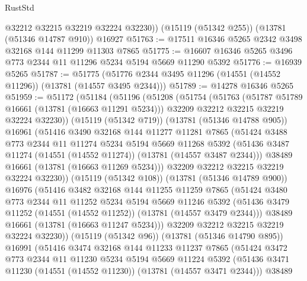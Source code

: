 \begin{lexlean}{RustStd}
\begin{coremodule}
        @32212
        @32215
        @32219
        @32224
        @32230))
    (@15119 (@51342 @255))
    (@13781 (@51346 @14787 @910))
    @16927
@51763 := @17511 @16346 @5265 @2342 @3498 @32168 @144 @11299 @11303 @7865
@51775 := @16607 @16346 @5265 @3496 @773 @2344 @11 @11296 @5234 @5194 @5669 @11290 @5392
@51776 := @16939 @5265
@51787 := @51775 (@51776 @2344 @3495 @11296 (@14551 (@14552 @11296)) (@13781 (@14557 @3495 @2344)))
@51789 := @14278 @16346 @5265
@51959 := @51172
    (@51184
      (@51196
        (@51208
          (@51754
            (@51763
              (@51787 @51789 @16661 (@13781 (@16663 @11291 @5234)))
              @32209
              @32212
              @32215
              @32219
              @32224
              @32230))
          (@15119 (@51342 @719))
          (@13781 (@51346 @14788 @905))
          @16961
          (@51416
            @3490
            @32168
            @144
            @11277
            @11281
            @7865
            (@51424
              @3488
              @773
              @2344
              @11
              @11274
              @5234
              @5194
              @5669
              @11268
              @5392
              (@51436 @3487 @11274 (@14551 (@14552 @11274)) (@13781 (@14557 @3487 @2344)))
              @38489
              @16661
              (@13781 (@16663 @11269 @5234)))
            @32209
            @32212
            @32215
            @32219
            @32224
            @32230))
        (@15119 (@51342 @108))
        (@13781 (@51346 @14789 @900))
        @16976
        (@51416
          @3482
          @32168
          @144
          @11255
          @11259
          @7865
          (@51424
            @3480
            @773
            @2344
            @11
            @11252
            @5234
            @5194
            @5669
            @11246
            @5392
            (@51436 @3479 @11252 (@14551 (@14552 @11252)) (@13781 (@14557 @3479 @2344)))
            @38489
            @16661
            (@13781 (@16663 @11247 @5234)))
          @32209
          @32212
          @32215
          @32219
          @32224
          @32230))
      (@15119 (@51342 @96))
      (@13781 (@51346 @14790 @895))
      @16991
      (@51416
        @3474
        @32168
        @144
        @11233
        @11237
        @7865
        (@51424
          @3472
          @773
          @2344
          @11
          @11230
          @5234
          @5194
          @5669
          @11224
          @5392
          (@51436 @3471 @11230 (@14551 (@14552 @11230)) (@13781 (@14557 @3471 @2344)))
          @38489

\end{coremodule}
\end{lexlean}
